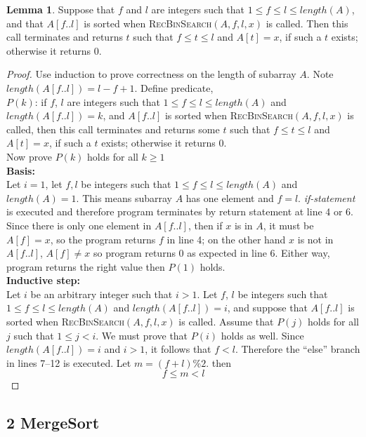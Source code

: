 \documentclass[11pt]{article}
\theoremstyle{plain}%
\theoremstyle{definition}
\newtheorem{lemma}{Lemma}[defn]
\theoremstyle{remark}
\begin{document}
\begin{lemma}
Suppose that $f$ and $l$ are integers such that $1 \leq f \leq l \leq length(A)$, and that $A[f..l]$ is sorted when \textsc{RecBinSearch}$(A, f, l, x)$ is called. Then this call terminates and returns $t$ such that $f \leq t \leq l$ and $A[t] = x$, if such a $t$ exists; otherwise it returns 0.

\begin{proof}
  Use induction to prove correctness on the length of subarray $A$. Note $length(A[f..l]) = l - f + 1$. Define predicate, \\
  $P(k)$: if $f$, $l$ are integers such that $1 \leq f \leq l \leq length(A)$ and $length(A[f..l]) = k$, and $A[f..l]$ is sorted when \textsc{RecBinSearch}$(A, f, l, x)$ is called, then this call terminates and returns some $t$ such that $f \leq t\leq l$ and $A[t] = x$, if such a $t$ exists; otherwise it returns 0. \\
  Now prove $P(k)$ holds for all $k\geq 1$\\
  \textbf{Basis:} \\
  Let $i=1$, let $f,l$ be integers such that $1\leq f\leq l \leq length(A)$ and $length(A)=1$. This means subarray $A$ has one element and $f=l$. \textit{if-statement} is executed and therefore program terminates by return statement at line 4 or 6. Since there is only one element in $A[f..l]$, then if $x$ is in $A$, it must be $A[f]=x$, so the program returns $f$ in line 4; on the other hand $x$ is not in $A[f..l]$, $A[f]\neq x$ so program returns 0 as expected in line 6. Either way, program returns the right value then $P(1)$ holds.\\
  \textbf{Inductive step:}\\
Let $i$ be an arbitrary integer such that $i > 1$. Let $f$, $l$ be integers such that $1 \leq f \leq l \leq length(A)$ and $length(A[f..l]) = i$, and suppose that $A[f..l]$ is sorted when \textsc{RecBinSearch}$(A, f, l, x)$ is called. Assume that $P(j)$ holds for all $j$ such that $1 \leq j < i$. We must prove that $P(i)$ holds as well. Since $length(A[f..l]) = i$ and $i > 1$, it follows that $f < l$. Therefore the “else” branch in lines 7–12 is executed. Let $m = (f + l) \% 2$. then
\[
  f\leq m<l
\]
\end{proof}
\end{lemma}


\subsection*{2 MergeSort}
\end{document}
